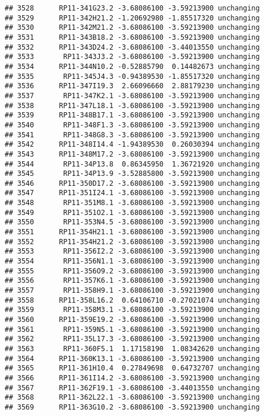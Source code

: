 \documentclass[]{article}
\begin{document}
\begin{verbatim}
## 3528      RP11-341G23.2 -3.68086100 -3.59213900 unchanging
## 3529      RP11-342H21.2 -1.20692980 -1.85517320 unchanging
## 3530      RP11-342M21.2 -3.68086100 -3.59213900 unchanging
## 3531      RP11-343B18.2 -3.68086100 -3.59213900 unchanging
## 3532      RP11-343D24.2 -3.68086100 -3.44013550 unchanging
## 3533       RP11-343J3.2 -3.68086100 -3.59213900 unchanging
## 3534      RP11-344N10.2 -0.52885790  0.14482673 unchanging
## 3535       RP11-345J4.3 -0.94389530 -1.85517320 unchanging
## 3536      RP11-347I19.3  2.66096660  2.88179230 unchanging
## 3537       RP11-347K2.1 -3.68086100 -3.59213900 unchanging
## 3538      RP11-347L18.1 -3.68086100 -3.59213900 unchanging
## 3539      RP11-348B17.1 -3.68086100 -3.59213900 unchanging
## 3540       RP11-348F1.3 -3.68086100 -3.59213900 unchanging
## 3541       RP11-348G8.3 -3.68086100 -3.59213900 unchanging
## 3542      RP11-348I14.4 -1.94389530  0.26030394 unchanging
## 3543      RP11-348M17.2 -3.68086100 -3.59213900 unchanging
## 3544       RP11-34P13.8  0.86345950  1.36721920 unchanging
## 3545       RP11-34P13.9 -3.52885800 -3.59213900 unchanging
## 3546      RP11-350D17.2 -3.68086100 -3.59213900 unchanging
## 3547      RP11-351I24.1 -3.68086100 -3.59213900 unchanging
## 3548       RP11-351M8.1 -3.68086100 -3.59213900 unchanging
## 3549       RP11-351O2.1 -3.68086100 -3.59213900 unchanging
## 3550       RP11-353N4.5 -3.68086100 -3.59213900 unchanging
## 3551      RP11-354H21.1 -3.68086100 -3.59213900 unchanging
## 3552      RP11-354H21.2 -3.68086100 -3.59213900 unchanging
## 3553       RP11-356I2.2 -3.68086100 -3.59213900 unchanging
## 3554       RP11-356N1.1 -3.68086100 -3.59213900 unchanging
## 3555       RP11-356O9.2 -3.68086100 -3.59213900 unchanging
## 3556       RP11-357K6.1 -3.68086100 -3.59213900 unchanging
## 3557       RP11-358H9.1 -3.68086100 -3.59213900 unchanging
## 3558      RP11-358L16.2  0.64106710 -0.27021074 unchanging
## 3559       RP11-358M3.1 -3.68086100 -3.59213900 unchanging
## 3560      RP11-359E19.2 -3.68086100 -3.59213900 unchanging
## 3561       RP11-359N5.1 -3.68086100 -3.59213900 unchanging
## 3562       RP11-35L17.3 -3.68086100 -3.59213900 unchanging
## 3563       RP11-360F5.1  1.17158190  1.08342620 unchanging
## 3564      RP11-360K13.1 -3.68086100 -3.59213900 unchanging
## 3565      RP11-361H10.4  0.27849698  0.64732707 unchanging
## 3566      RP11-361I14.2 -3.68086100 -3.59213900 unchanging
## 3567      RP11-362F19.1 -3.68086100 -3.44013550 unchanging
## 3568      RP11-362L22.1 -3.68086100 -3.59213900 unchanging
## 3569      RP11-363G10.2 -3.68086100 -3.59213900 unchanging

\end{verbatim}
\end{document}
